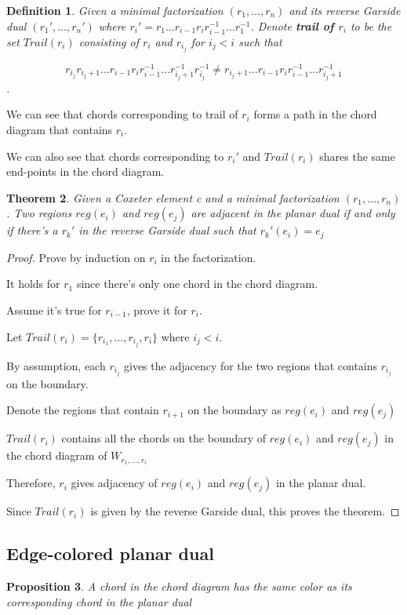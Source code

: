 \documentclass[11pt]{amsart}
\newcommand\ki[2]{{\color{blue}#1}{\color{red}#2}}
\newtheorem{thm}{Theorem}[section]
\newtheorem{defi}[thm]{Definition}%
\newtheorem{prop}[thm]{Proposition}%
\begin{document}
\begin{defi}
    Given a minimal factorization $(r_1,\dots,r_n)$ and its reverse Garside dual $(r_1',\dots,r_n')$ where $r_i'=r_1 \dots r_{i-1} r_i r_{i-1}^{-1} \dots r_1^{-1}$. Denote \textbf{trail of $r_i$} to be the set $Trail(r_i)$ consisting of $r_i$ and \ki{$r_{i_j}$ for}{} $i_j < i$ such that
    
    $$r_{i_j}r_{i_j+1}\dots r_{i-1} r_i r_{i-1}^{-1} \dots r_{i_j+1}^{-1}r_{i_j}^{-1} \neq r_{i_j+1}\dots r_{i-1} r_i r_{i-1}^{-1} \dots r_{i_j+1}^{-1}$$. 
\end{defi}

We can see that chords corresponding to trail of $r_i$ forms a path in the chord diagram that contains $r_i$.

We can also see that chords corresponding to $r_i'$ and $Trail(r_i)$ shares the same end-points in the chord diagram. 

\begin{thm}\label{thm C}
    Given a Coxeter element c and a minimal factorization $(r_1,\dots,r_n)$. Two regions $reg(e_i)$ and $reg(e_j)$ are adjacent in the planar dual if and only if there's a $r_k'$ in the reverse Garside dual such that $r_k'(e_i)=e_j$
\end{thm}

\begin{proof}
    Prove by induction on $r_i$ in the factorization.
    
    It holds for $r_1$ since there's only one chord in the chord diagram.

    Assume it's true for $r_{i-1}$, prove it for $r_i$.

    Let $Trail(r_i)=\{r_{i_1},\dots,r_{i_j},r_i\}$ where $i_j < i$.

    By assumption, each $r_{i_j}$ gives the adjacency for the two regions that contains $r_{i_j}$ on the boundary.

    Denote the regions that contain $r_{i+1}$ on the boundary as $reg(e_i)$ and $reg(e_j)$

    $Trail(r_i)$ contains all the chords on the boundary of $reg(e_i)$ and $reg(e_j)$ in the chord diagram of $W_{r_1,\dots,r_i}$

    Therefore, $r_i$ gives adjacency of $reg(e_i)$ and $reg(e_j)$ in the planar dual.

    Since $Trail(r_i)$ is given by the reverse Garside dual, this proves the theorem.
\end{proof}

\subsection{Edge-colored planar dual}
\begin{prop}
    A chord in the chord diagram has the same color as its corresponding chord in the planar dual
\end{prop}
\end{document}
